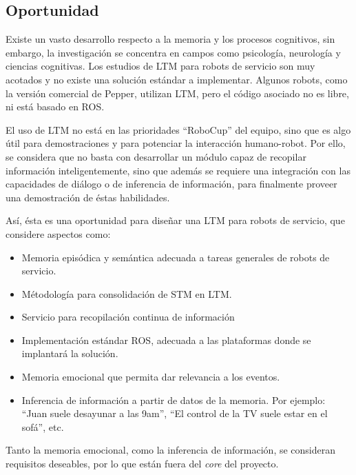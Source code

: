 \subsection{Oportunidad}

Existe un vasto desarrollo respecto a la memoria y los procesos cognitivos, sin embargo, la investigaci\'on se concentra en campos como psicolog\'ia, neurolog\'ia y ciencias cognitivas. 
Los estudios de LTM para robots de servicio son muy acotados y no existe una soluci\'on est\'andar a implementar. Algunos robots, como la versi\'on comercial de Pepper, utilizan LTM, pero el c\'odigo asociado no es libre, ni est\'a basado en ROS.

El uso de LTM no est\'a en las prioridades ``RoboCup'' del equipo, sino que es algo \'util para demostraciones y para potenciar la interacci\'on humano-robot. Por ello, se considera que no basta con desarrollar un m\'odulo capaz de recopilar informaci\'on inteligentemente, sino que adem\'as se requiere una integraci\'on con las capacidades de di\'alogo o de inferencia de informaci\'on, para finalmente proveer una demostraci\'on de \'estas habilidades.

As\'i, \'esta es una oportunidad para dise\~nar una LTM para robots de servicio, que considere aspectos como: 
\begin{itemize}
\item Memoria epis\'odica y sem\'antica adecuada a tareas generales de robots de servicio.
\item M\'etodolog\'ia para consolidaci\'on de STM en LTM.
\item Servicio para recopilaci\'on continua de informaci\'on
\item Implementaci\'on est\'andar ROS, adecuada a las plataformas donde se implantar\'a la soluci\'on.
\item Memoria emocional que permita dar relevancia a los eventos.
\item Inferencia de informaci\'on a partir de datos de la memoria. Por ejemplo: ``Juan suele desayunar a las 9am'', ``El control de la TV suele estar en el sof\'a'', etc.
\end{itemize}

Tanto la memoria emocional, como la inferencia de informaci\'on, se consideran requisitos deseables, por lo que est\'an fuera del \textit{core} del proyecto.

